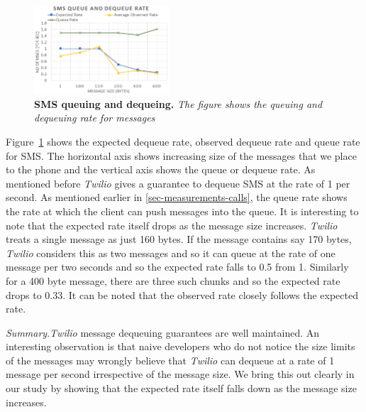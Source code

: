 \begin{figure} \centering
\includegraphics[width=0.45\textwidth]{graphs/sms.pdf}
\caption{\textbf{SMS queuing and dequeing.} {\footnotesize\textit{
The figure shows the queuing and dequeuing rate for messages
}}}
\label{fig:sms}
\end{figure}

Figure~\ref{fig:sms} shows the expected dequeue rate, observed dequeue rate and queue rate for SMS. The horizontal axis shows increasing size of the messages that we place to the phone and the vertical axis shows the queue or dequeue rate. As mentioned before \textit{Twilio} gives a guarantee to dequeue SMS at the rate of 1 per second. As mentioned earlier in \ref{sec-measurements-calls}, the queue rate shows the rate at which the client can push messages into the queue. It is interesting to note that the expected rate itself drops as the message size increases. \textit{Twilio} treats a single message as just 160 bytes. If the message contains say 170 bytes, \textit{Twilio} considers this as two messages and so it can queue at the rate of one message per two seconds and so the expected rate falls to 0.5 from 1. Similarly for a 400 byte message, there are three such chunks and so the expected rate drops to 0.33. It can be noted that the observed rate closely follows the expected rate. 

\textit{Summary}.\textit{Twilio} message dequeuing guarantees are well maintained. An interesting observation is that naive developers who do not notice the size limits of the messages may wrongly believe that \textit{Twilio} can dequeue at a rate of 1 message per second irrespective of the message size. We bring this out clearly in our study by showing that the expected rate itself falls down as the message size increases. 




